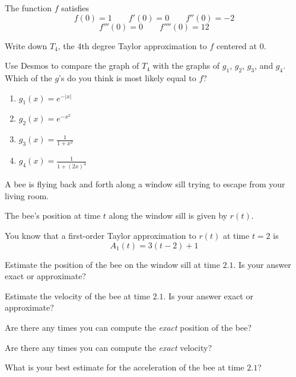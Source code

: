 \documentclass{workbook}
\begin{document}
\begin{slide}
	\question
	The function $f$ satisfies
	\[f(0)= 1\qquad f'(0)=0\qquad f''(0)=-2\]\[ f'''(0)=0\qquad f''''(0)=12\]

	\begin{parts}
		\item Write down $T_4$, the 4th degree Taylor approximation to $f$ centered at $0$.
		\item Use Desmos to compare the graph of $T_4$ with the graphs of $g_1$,
		$g_2$, $g_3$, and $g_4$. Which of the $g$'s do you think is most likely equal to $f$?
		\begin{enumerate}
			\item $g_1(x)=e^{-|x|}$
			\item $g_2(x)=e^{-x^2}$
			\item $\displaystyle g_3(x)=\frac{1}{1+x^2}$
			\item $\displaystyle g_4(x)=\frac{1}{1+(2x)^4}$
		\end{enumerate}
	\end{parts}

\end{slide}



\begin{slide}
	\question
	A bee is flying back and forth along a window sill trying to escape from your living room.

	The bee's position at time $t$ along the window sill is given by $r(t)$.

	You know that a first-order Taylor approximation to $r(t)$ at time $t=2$
	is
	\[
		A_1(t)=3(t-2)+1
	\]

	\begin{parts}
		\item Estimate the position of the bee on the window sill at time
		$2.1$. Is your answer exact or approximate?
		\item Estimate the velocity of the bee at time $2.1$. Is your answer exact or approximate?
		\item Are there any times you can compute the \emph{exact} position of the bee?
		\item Are there any times you can compute the \emph{exact} velocity?
		\item What is your best estimate for the acceleration of the
		bee at time $2.1$?
	\end{parts}
\end{slide}
\end{document}
